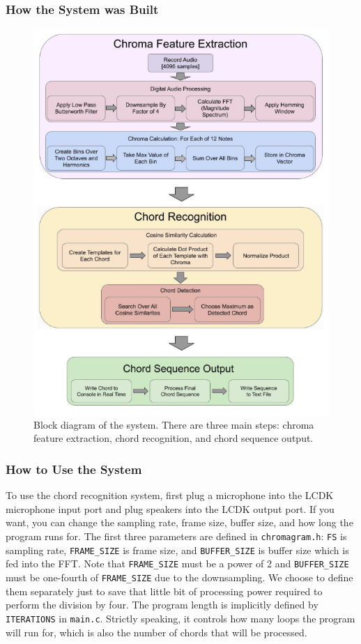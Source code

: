 \documentclass[journal]{IEEEtran}
\begin{document}
\subsubsection{How the System was Built}
\begin{figure}[!t]
    \centering
    \includegraphics[width = \linewidth]{../Figures/block_diagram}
    \caption{Block diagram of the system.
    There are three main steps: chroma feature extraction, chord recognition, and chord sequence output.}
    \label{fig:block}
\end{figure}


\subsubsection{How to Use the System}
To use the chord recognition system, first plug a microphone into the LCDK microphone input port and plug speakers into the LCDK output port.
If you want, you can change the sampling rate, frame size, buffer size, and how long the program runs for.
The first three parameters are defined in \texttt{chromagram.h}: \texttt{FS} is sampling rate, \texttt{FRAME\_SIZE} is frame size, and \texttt{BUFFER\_SIZE} is buffer size which is fed into the FFT.
Note that \texttt{FRAME\_SIZE} must be a power of 2 and \texttt{BUFFER\_SIZE} must be one-fourth of \texttt{FRAME\_SIZE} due to the downsampling.
We choose to define them separately just to save that little bit of processing power required to perform the division by four.
The program length is implicitly defined by \texttt{ITERATIONS} in \texttt{main.c}.
Strictly speaking, it controls how many loops the program will run for, which is also the number of chords that will be processed.
\end{document}

